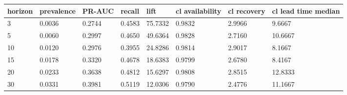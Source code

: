 \begin{tabular}{llllllll}
\toprule
horizon & prevalence & PR-AUC & recall & lift & cl availability & cl recovery & cl lead time median \\
\midrule
3 & 0.0036 & 0.2744 & 0.4583 & 75.7332 & 0.9832 & 2.9966 & 9.6667 \\
5 & 0.0060 & 0.2997 & 0.4650 & 49.6364 & 0.9828 & 2.7160 & 10.6667 \\
10 & 0.0120 & 0.2976 & 0.3955 & 24.8286 & 0.9814 & 2.9017 & 8.1667 \\
15 & 0.0178 & 0.3320 & 0.4678 & 18.6383 & 0.9799 & 2.6780 & 8.4167 \\
20 & 0.0233 & 0.3638 & 0.4812 & 15.6297 & 0.9808 & 2.8515 & 12.8333 \\
30 & 0.0331 & 0.3981 & 0.5119 & 12.0306 & 0.9790 & 2.4776 & 11.1667 \\
\bottomrule
\end{tabular}

